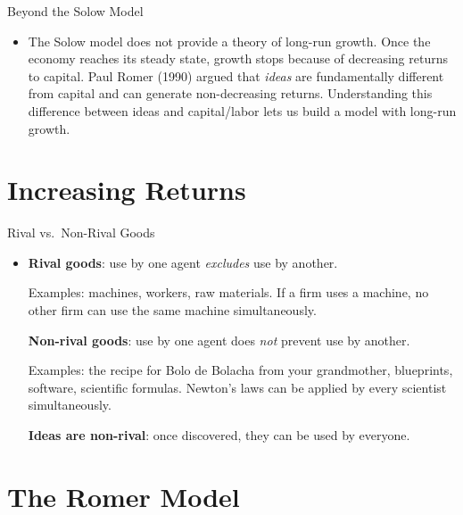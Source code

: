 \documentclass[10pt,aspectratio=169]{beamer}
\begin{document}
\begin{frame}{Beyond the Solow Model}
\begin{itemize}
    \item The Solow model does not provide a theory of long-run growth.
    \itemvso Once the economy reaches its steady state, growth stops because of decreasing returns to capital.
    \itemvso Paul Romer (1990) argued that \emph{ideas} are fundamentally different from capital and can generate non-decreasing returns.
    \itemvso Understanding this difference between ideas and capital/labor lets us build a model with long-run growth.
\end{itemize}
\end{frame}

\section{Increasing Returns}

\begin{frame}{Rival vs.\ Non-Rival Goods}
\begin{itemize}
    \item \textbf{Rival goods}: use by one agent \emph{excludes} use by another.
    \begin{itemize}
        \itemvso Examples: machines, workers, raw materials.
        \itemvso If a firm uses a machine, no other firm can use the same machine simultaneously.
    \end{itemize}
    \itemvso \textbf{Non-rival goods}: use by one agent does \emph{not} prevent use by another.
    \begin{itemize}
        \itemvso Examples: the recipe for Bolo de Bolacha from your grandmother, blueprints, software, scientific formulas.
        \itemvso Newton's laws can be applied by every scientist simultaneously.
    \end{itemize}
    \itemvso \textbf{Ideas are non-rival}: once discovered, they can be used by everyone.
\end{itemize}
\end{frame}

\section{The Romer Model}
\end{document}
